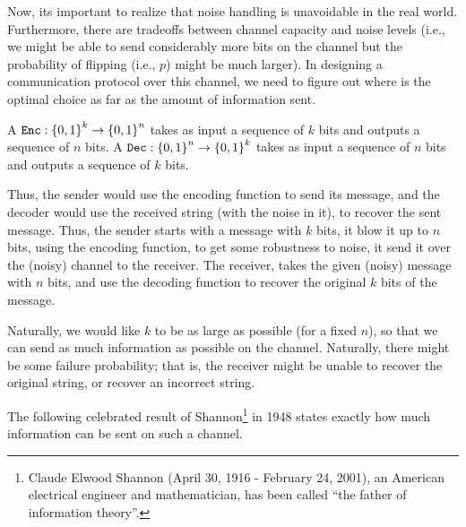 Now, its important to realize that noise handling is unavoidable in
the real world. Furthermore, there are tradeoffs between channel
capacity and noise levels (i.e., we might be able to send considerably
more bits on the channel but the probability of flipping (i.e., $p$)
might be much larger). In designing a communication protocol over this
channel, we need to figure out where is the optimal choice as far as
the amount of information sent.

\begin{defn}
    A 
    $\text{\ttfamily{Enc}}: \left\{ {0,1} \right\}^k \rightarrow \left\{ {0,1} \right\}^n$ takes as input
    a sequence of $k$ bits and outputs a sequence of $n$ bits. A
    $\text{\ttfamily{Dec}}: \left\{ {0,1} \right\}^n \rightarrow \left\{ {0,1} \right\}^k$ takes as input
    a sequence of $n$ bits and outputs a sequence of $k$ bits.
\end{defn}

Thus, the sender would use the encoding function to send its message,
and the decoder would use the received string (with the noise in it),
to recover the sent message. Thus, the sender starts with a message
with $k$ bits, it blow it up to $n$ bits, using the encoding function,
to get some robustness to noise, it send it over the (noisy) channel
to the receiver. The receiver, takes the given (noisy) message with
$n$ bits, and use the decoding function to recover the original $k$
bits of the message.

Naturally, we would like $k$ to be as large as possible (for a fixed
$n$), so that we can send as much information as possible on the
channel. Naturally, there might be some failure probability; that is,
the receiver might be unable to recover the original string, or
recover an incorrect string.

The following celebrated result of Shannon\footnote{Claude Elwood
   Shannon (April 30, 1916 - February 24, 2001), an American
   electrical engineer and mathematician, has been called ``the father
   of information theory''. } in 1948 states exactly how much
information can be sent on such a channel.

